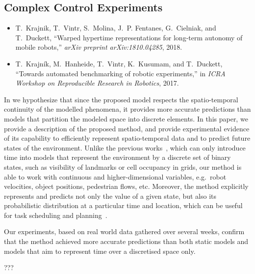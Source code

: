 \subsection{Complex Control Experiments}

\begin{itemize}
    \item T.~Krajnik, T.~Vintr, S.~Molina, J.~P. Fentanes, G.~Cielniak, and T.~Duckett, ``Warped hypertime representations for long-term autonomy of mobile robots,'' \emph{arXiv preprint arXiv:1810.04285}, 2018.
    \item T.~Krajn{\'i}k, M.~Hanheide, T.~Vintr, K.~Kusumam, and T.~Duckett, ``Towards automated benchmarking of robotic experiments,'' in \emph{ICRA Workshop on  Reproducible Research in Robotics}, 2017.
\end{itemize}

In \cite{krajnik2018warped} we hypothesize that since the proposed model respects the spatio-temporal continuity of the modelled phenomena, it provides more accurate predictions than models that partition the modeled space into discrete elements. 
In this paper, we provide a description of the proposed method, and provide experimental evidence of its capability to efficiently represent spatio-temporal data and to predict future states of the environment.
Unlike the previous works~\cite{tipaldi2013lifelong,rosen2016towards,kucner2013conditional,krajnik2017fremen}, which can only introduce time into models that represent the environment by a discrete set of binary states, such as visibility of landmarks or cell occupancy in grids, our method is able to work with continuous and higher-dimensional variables, e.g.\ robot velocities, object positions, pedestrian flows, etc.
Moreover, the method explicitly represents and predicts not only the value of a given state, but also its probabilistic distribution at a particular time and location, which can be useful for task scheduling and planning~\cite{mudrova2015integrated}.

Our experiments, based on real world data gathered over several weeks, confirm that the method achieved more accurate predictions than both static models and models that aim to represent time over a discretised space only.


???

